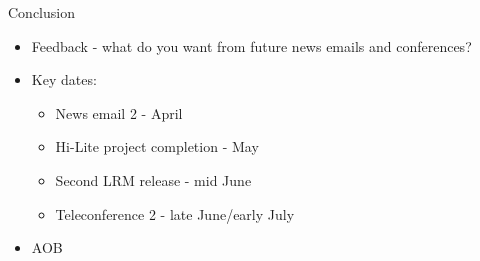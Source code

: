 \documentclass{beamer}
\begin{document}
\begin{frame}{Conclusion}

  \begin{itemize}

  \item Feedback - what do you want from future news emails and conferences?

  \item Key dates: 
    \begin{itemize}
    \item News email 2 - April
    \item Hi-Lite project completion - May
    \item Second LRM release - mid June
    \item Teleconference 2 - late June/early July
    \end{itemize}

  \item AOB

  \end{itemize}

\end{frame}
\end{document}

